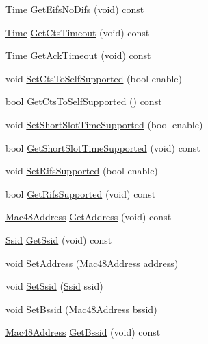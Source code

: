 \begin{DoxyCompactItemize}
\hyperlink{classns3_1_1Time}{Time} \hyperlink{classns3_1_1RegularWifiMac_acbf136f7e1c4baf88ffa421f8aad4c39}{Get\+Eifs\+No\+Difs} (void) const 
\item 
\hyperlink{classns3_1_1Time}{Time} \hyperlink{classns3_1_1RegularWifiMac_a4356639232c01c9cac0adac74dd5c425}{Get\+Cts\+Timeout} (void) const 
\item 
\hyperlink{classns3_1_1Time}{Time} \hyperlink{classns3_1_1RegularWifiMac_aaf558d0d59e90ce67d428d72ff7d7fba}{Get\+Ack\+Timeout} (void) const 
\item 
void \hyperlink{classns3_1_1RegularWifiMac_a0ac262241ccb19ebbdd8bde779eab481}{Set\+Cts\+To\+Self\+Supported} (bool enable)
\item 
bool \hyperlink{classns3_1_1RegularWifiMac_abc0293f087f9ff963f47d318deeb2b49}{Get\+Cts\+To\+Self\+Supported} () const 
\item 
void \hyperlink{classns3_1_1RegularWifiMac_a0c36150e82bb7a83ea390d89621de0d5}{Set\+Short\+Slot\+Time\+Supported} (bool enable)
\item 
bool \hyperlink{classns3_1_1RegularWifiMac_a05ec5d1fa4fffd5067a811d3bc1ddd72}{Get\+Short\+Slot\+Time\+Supported} (void) const 
\item 
void \hyperlink{classns3_1_1RegularWifiMac_aeaf976acb7d73b023ad9d554bdf68bc9}{Set\+Rifs\+Supported} (bool enable)
\item 
bool \hyperlink{classns3_1_1RegularWifiMac_aee913cae11540b2878873ca3ac968afc}{Get\+Rifs\+Supported} (void) const 
\item 
\hyperlink{classns3_1_1Mac48Address}{Mac48\+Address} \hyperlink{classns3_1_1RegularWifiMac_aea719a7d05fbc664c50479fc900777b7}{Get\+Address} (void) const 
\item 
\hyperlink{classns3_1_1Ssid}{Ssid} \hyperlink{classns3_1_1RegularWifiMac_a3cd4316ccd72111fa94f7091d4deb521}{Get\+Ssid} (void) const 
\item 
void \hyperlink{classns3_1_1RegularWifiMac_a71265ac4dff0a65208bed95af4031391}{Set\+Address} (\hyperlink{classns3_1_1Mac48Address}{Mac48\+Address} address)
\item 
void \hyperlink{classns3_1_1RegularWifiMac_abfc1a954b492e73f2bcb2bb534f3098c}{Set\+Ssid} (\hyperlink{classns3_1_1Ssid}{Ssid} ssid)
\item 
void \hyperlink{classns3_1_1RegularWifiMac_a24af45a5447f736b996a48a0db584e99}{Set\+Bssid} (\hyperlink{classns3_1_1Mac48Address}{Mac48\+Address} bssid)
\item 
\hyperlink{classns3_1_1Mac48Address}{Mac48\+Address} \hyperlink{classns3_1_1RegularWifiMac_acd1705832e3f4a235c2ca6a84b5a577b}{Get\+Bssid} (void) const 

\end{DoxyCompactItemize}
